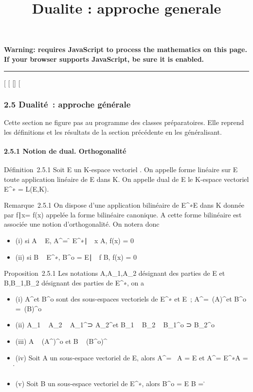 \documentclass[]{article}
\title{Dualite : approche generale}
\author{}
\date{}
\begin{document}
\maketitle

\textbf{Warning: 
requires JavaScript to process the mathematics on this page.\\ If your
browser supports JavaScript, be sure it is enabled.}

\begin{center}\rule{3in}{0.4pt}\end{center}

{[}
{[}
{[}{]}
{[}

\subsubsection{2.5 Dualité~: approche générale}

Cette section ne figure pas au programme des classes préparatoires. Elle
reprend les définitions et les résultats de la section précédente en les
généralisant.

\paragraph{2.5.1 Notion de dual. Orthogonalité}

Définition~2.5.1 Soit E un K-espace vectoriel . On appelle forme
linéaire sur E toute application linéaire de E dans K. On appelle dual
de E le K-espace vectoriel E^∗ = L(E,K).

Remarque~2.5.1 On dispose d'une application bilinéaire de
E^∗\times E dans K donnée par \langle
f∣x\rangle = f(x) appelée la
forme bilinéaire canonique. A cette forme bilinéaire est associée une
notion d'orthogonalité. On notera donc

\begin{itemize}
\itemsep1pt\parskip0pt
\item
  (i) si A \subset~ E, A^\bot = \f \in
  E^∗∣\forall~~x
  \in A, f(x) = 0\
\item
  (ii) si B \subset~ E^∗, B^o = \x \in
  E∣\forall~~f \in B, f(x) =
  0\
\end{itemize}

Proposition~2.5.1 Les notations A,A\_1,A\_2 désignant
des parties de E et B,B\_1,B\_2 désignant des parties de
E^∗, on a

\begin{itemize}
\itemsep1pt\parskip0pt
\item
  (i) A^\bot et B^o sont des sous-espaces vectoriels
  de E^∗ et E~; A^\bot =\
  \mathrmVect(A)^\bot et B^o
  =\
  \mathrmVect(B)^o
\item
  (ii) A\_1 \subset~ A\_2 \rigtharrow~ A\_1^\bot⊃
  A\_2^\bot et B\_1 \subset~ B\_2 \rigtharrow~
  B\_1^o ⊃ B\_2^o
\item
  (iii) A \subset~ (A^\bot)^o et B \subset~
  (B^o)^\bot
\item
  (iv) Soit A un sous-espace vectoriel de E, alors A^\bot =
  \0\ \Leftrightarrow A =
  E et A^\bot = E^∗\Leftrightarrow A =
  \0\.
\item
  (v) Soit B un sous-espace vectoriel de E^∗, alors
  B^o = E \Leftrightarrow B =
  \0\.
\end{itemize}
\end{document}
